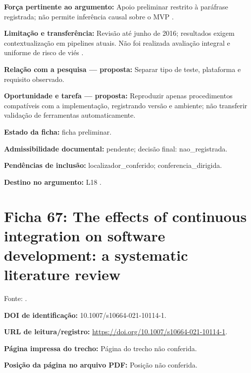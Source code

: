 \noindent\textbf{Força pertinente ao argumento:} Apoio preliminar restrito à paráfrase registrada; não permite inferência causal sobre o MVP \citep{eng14}.\par\medskip

\noindent\textbf{Limitação e transferência:} Revisão até junho de 2016; resultados exigem contextualização em pipelines atuais. Não foi realizada avaliação integral e uniforme de risco de viés \citep{eng14}.\par\medskip

\noindent\textbf{Relação com a pesquisa — proposta:} Separar tipo de teste, plataforma e requisito observado.\par\medskip

\noindent\textbf{Oportunidade e tarefa — proposta:} Reproduzir apenas procedimentos compatíveis com a implementação, registrando versão e ambiente; não transferir validação de ferramentas automaticamente.\par\medskip

\noindent\textbf{Estado da ficha:} ficha preliminar.\par\medskip

\noindent\textbf{Admissibilidade documental:} pendente; decisão final: nao\_registrada.\par\medskip

\noindent\textbf{Pendências de inclusão:} localizador\_conferido; conferencia\_dirigida.\par\medskip

\noindent\textbf{Destino no argumento:} L18 .

\clearpage\section*{Ficha 67: The effects of continuous integration on software development: a systematic literature review}

Fonte: \citet{eng15}.

\noindent\textbf{DOI de identificação:} 10.1007/s10664-021-10114-1.\par\medskip

\noindent\textbf{URL de leitura/registro:} \url{https://doi.org/10.1007/s10664-021-10114-1}.\par\medskip

\noindent\textbf{Página impressa do trecho:} Página do trecho não conferida.\par\medskip

\noindent\textbf{Posição da página no arquivo PDF:} Posição não conferida.\par\medskip

